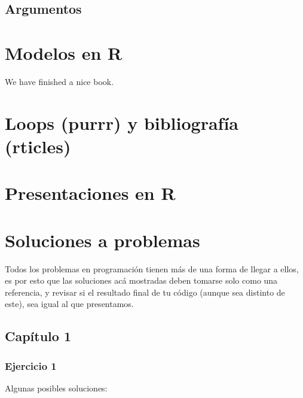 \documentclass[]{book}
\newenvironment{Shaded}{\begin{snugshade}}{\end{snugshade}}
\newcommand{\KeywordTok}[1]{\textcolor[rgb]{0.13,0.29,0.53}{\textbf{#1}}}
\newcommand{\NormalTok}[1]{#1}
\newcommand{\OperatorTok}[1]{\textcolor[rgb]{0.81,0.36,0.00}{\textbf{#1}}}
\newcommand{\StringTok}[1]{\textcolor[rgb]{0.31,0.60,0.02}{#1}}
\begin{document}
\hypertarget{argumentos}{%
\section{Argumentos}\label{argumentos}}

\hypertarget{modelos}{%
\chapter{Modelos en R}\label{modelos}}

We have finished a nice book.

\hypertarget{loops}{%
\chapter{Loops (purrr) y bibliografía (rticles)}\label{loops}}

\hypertarget{presentacion}{%
\chapter{Presentaciones en R}\label{presentacion}}

\hypertarget{soluciones}{%
\chapter{Soluciones a problemas}\label{soluciones}}

Todos los problemas en programación tienen más de una forma de llegar a
ellos, es por esto que las soluciones acá mostradas deben tomarse solo
como una referencia, y revisar si el resultado final de tu código
(aunque sea distinto de este), sea igual al que presentamos.

\hypertarget{capitulo-1}{%
\section{Capítulo 1}\label{capitulo-1}}

\hypertarget{ejercicio-1-1}{%
\subsection{Ejercicio 1}\label{ejercicio-1-1}}

Algunas posibles soluciones:

\begin{Shaded}
\end{Shaded}
\end{document}

